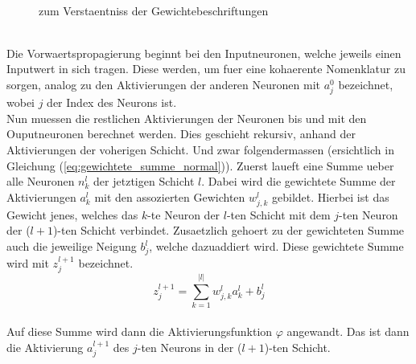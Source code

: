 \\
\begin{figure}[h!]
  \centering
  \label{fig:nomenklatur2}
  \caption{zum Verstaentniss der Gewichtebeschriftungen}
\end{figure}
\\
Die Vorwaertspropagierung beginnt bei den Inputneuronen, welche jeweils
einen Inputwert in sich tragen. Diese werden, um fuer eine kohaerente Nomenklatur zu sorgen,
analog zu den Aktivierungen der anderen Neuronen mit $a_j^0$ bezeichnet, wobei
$j$ der Index des Neurons ist. \\
Nun muessen die restlichen Aktivierungen der Neuronen bis und mit den Ouputneuronen berechnet werden. Dies geschieht rekursiv, anhand der
Aktivierungen der voherigen Schicht. Und zwar folgendermassen (ersichtlich in
Gleichung (\ref{eq:gewichtete_summe_normal})).
\para{}
Zuerst laueft eine Summe ueber alle Neuronen $n_k^{l}$ der jetztigen Schicht
$l$. Dabei wird die gewichtete Summe der Aktivierungen $a_k^{l}$ mit den
assozierten Gewichten $w_{j,k}^l$ gebildet. Hierbei ist das Gewicht jenes, welches das
$k$-te Neuron der $l$-ten Schicht mit dem $j$-ten Neuron der ($l+1$)-ten Schicht verbindet.
Zusaetzlich gehoert zu der gewichteten Summe auch die jeweilige Neigung $b_j^l$, welche
dazuaddiert wird. Diese gewichtete Summe wird mit $z_j^{l+1}$ bezeichnet.
\\
\begin{equation}\tag{FP1}\label{eq:gewichtete_summe_normal}
  z_j^{l+1} = \sum_{k=1}^{|l|} w_{j,k}^l a_k^l + b_j^l
\end{equation}
\\
Auf diese Summe wird dann die Aktivierungsfunktion $\varphi$ angewandt.
Das ist dann die Aktivierung $a_j^{l+1}$ des $j$-ten Neurons in der ($l+1$)-ten Schicht.
\\
